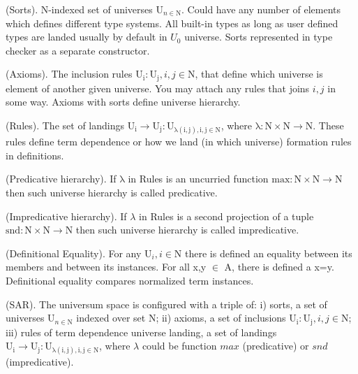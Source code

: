 \documentclass{article}
\begin{document}
\begin{definition} (Sorts). N-indexed set of universes $\mathrm{U}_{n \in \mathrm{N}}$.
Could have any number of elements which defines different type systems. All built-in
types as long as user defined types are landed usually by default in $U_0$ universe.
Sorts represented in type checker as a separate constructor.
\end{definition}

\begin{definition} (Axioms). The inclusion rules {\bf $\mathrm{U_i : U_j}, i,j \in \mathrm{N}$},
that define which universe is element of another given universe. You may attach
any rules that joins $i,j$ in some way. Axioms with sorts define universe hierarchy.
\end{definition}

\begin{definition} (Rules). The set of landings
$\mathrm{U_i} \rightarrow \mathrm{U_j} : \mathrm{U_{\lambda(i,j), i,j \in \mathrm{N}}}$,
where $\mathrm{\lambda : N \times N \rightarrow N}$. These rules define term dependence or
how we land (in which universe) formation rules in definitions.
\end{definition}

\begin{definition} (Predicative hierarchy). If $\mathrm{\lambda}$ in Rules
is an uncurried function $\mathrm{max : N \times N \rightarrow N}$
then such universe hierarchy is called predicative.
\end{definition}

\begin{definition} (Impredicative hierarchy). If $\lambda$ in Rules
is a second projection of a tuple $\mathrm{snd : N \times N \rightarrow N}$
then such universe hierarchy is called impredicative.
\end{definition}

\begin{definition} (Definitional Equality). For any $\mathrm{U}_i, i \in \mathrm{N}$ there is
defined an equality between its members and between its instances.
For all x,y $\in$ A, there is defined a x=y. Definitional equality
compares normalized term instances.
\end{definition}

\begin{definition} (SAR). The universum space is configured with a triple of:
i) sorts, a set of universes  $\mathrm{U}_{n \in \mathrm{N}}$ indexed over set N;
ii) axioms, a set of inclusions {\bf $\mathrm{U_i : U_j}, i,j \in \mathrm{N}$};
iii) rules of term dependence universe landing, a set of landings
$\mathrm{U_i} \rightarrow \mathrm{U_j} : \mathrm{U_{\lambda(i,j), i,j \in \mathrm{N}}}$, where $\lambda$ could be function $max$ (predicative) or $snd$ (impredicative).
\end{definition}
\end{document}
